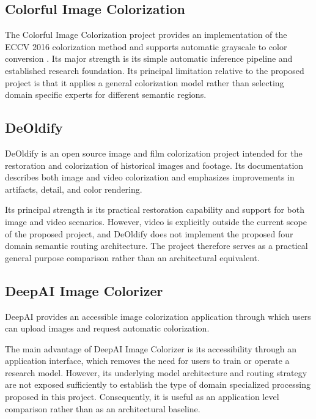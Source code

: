 \documentclass{FastFyp}
\begin{document}
\subsection{Colorful Image Colorization}

The Colorful Image Colorization project provides an implementation of the ECCV 2016 colorization method and supports automatic grayscale to color conversion \cite{ref1,ref22}. Its major strength is its simple automatic inference pipeline and established research foundation. Its principal limitation relative to the proposed project is that it applies a general colorization model rather than selecting domain specific experts for different semantic regions.

\subsection{DeOldify}

DeOldify \cite{deoldify} is an open source image and film colorization project intended for the restoration and colorization of historical images and footage. Its documentation describes both image and video colorization and emphasizes improvements in artifacts, detail, and color rendering.

Its principal strength is its practical restoration capability and support for both image and video scenarios. However, video is explicitly outside the current scope of the proposed project, and DeOldify does not implement the proposed four domain semantic routing architecture. The project therefore serves as a practical general purpose comparison rather than an architectural equivalent.

\subsection{DeepAI Image Colorizer}

DeepAI \cite{deepai} provides an accessible image colorization application through which users can upload images and request automatic colorization.

The main advantage of DeepAI Image Colorizer is its accessibility through an application interface, which removes the need for users to train or operate a research model. However, its underlying model architecture and routing strategy are not exposed sufficiently to establish the type of domain specialized processing proposed in this project. Consequently, it is useful as an application level comparison rather than as an architectural baseline.
\end{document}

